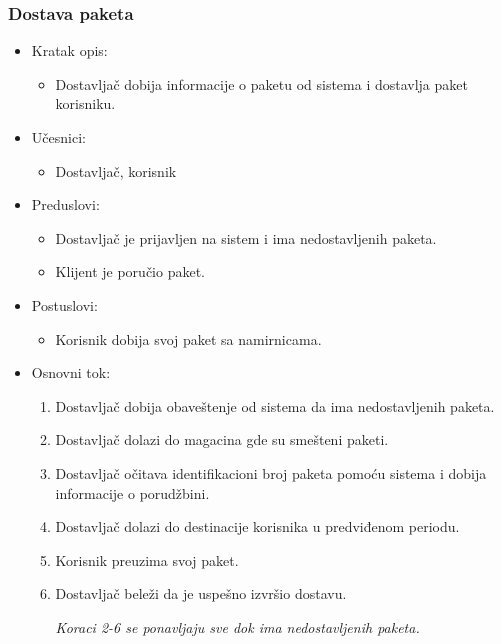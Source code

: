 
\subsubsection{Dostava paketa}

	\begin{itemize}
		\item{Kratak opis:} 
		\begin{itemize}
			\item{Dostavljač dobija informacije o paketu od sistema i dostavlja paket korisniku.}
		\end{itemize}
		
		\item{Učesnici:} 
		\begin{itemize}
			\item{Dostavljač, korisnik}
		\end{itemize}		
		
		\item{Preduslovi:}
		\begin{itemize}
			\item{Dostavljač je prijavljen na sistem i ima nedostavljenih paketa. }
			\item{Klijent je poručio paket.}
		\end{itemize}		

		\item{Postuslovi:}
		\begin{itemize}
			\item{Korisnik dobija svoj paket sa namirnicama.}
		\end{itemize}		
		
		\item{Osnovni tok:}
		\begin{enumerate}
			\item{Dostavljač dobija obaveštenje od sistema da ima nedostavljenih paketa.}
			\item{Dostavljač dolazi do magacina gde su smešteni paketi.}
			\item{Dostavljač očitava identifikacioni broj paketa pomoću sistema i dobija informacije o porudžbini.}
			\item{Dostavljač dolazi do destinacije korisnika u predviđenom periodu.}
			\item{Korisnik preuzima svoj paket.}
			\item{Dostavljač beleži da je uspešno izvršio dostavu.}
			
			
			\textit{Koraci 2-6 se ponavljaju sve dok ima nedostavljenih paketa.}
		\end{enumerate}
		

\end{itemize}
